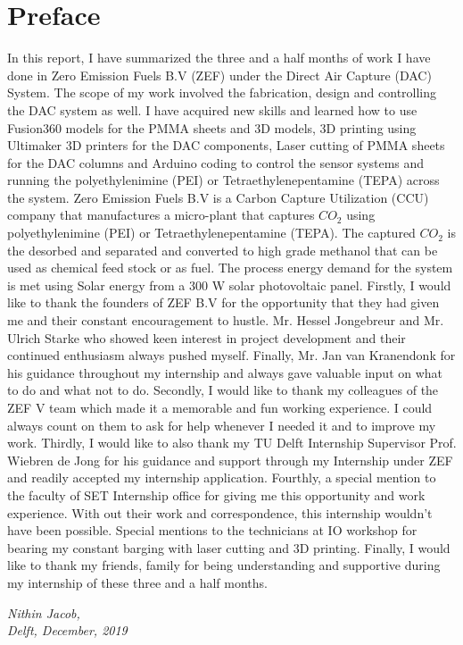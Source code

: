 \section*{Preface}

In this report, I have summarized the three and a half months of work I have done in Zero Emission Fuels B.V (ZEF) under the Direct Air Capture (DAC) System. The scope of my work involved the fabrication, design and controlling the DAC system as well. I have acquired new skills and learned how to use Fusion360 models for the PMMA sheets and 3D models, 3D printing using Ultimaker 3D printers for the DAC components, Laser cutting of PMMA sheets for the DAC columns and Arduino coding to control the sensor systems and running the polyethylenimine (PEI) or Tetraethylenepentamine (TEPA) across the system. 
\bigbreak
\noindent
Zero Emission Fuels B.V is a Carbon Capture Utilization (CCU) company that manufactures a micro-plant that captures $CO_2$ using polyethylenimine (PEI) or Tetraethylenepentamine (TEPA). The captured $CO_2$ is the desorbed and separated and converted to high grade methanol that can be used as chemical feed stock or as fuel. The process energy demand for the system is met using Solar energy from a 300 W solar photovoltaic panel.
\bigbreak
\noindent
Firstly, I would like to thank the founders of ZEF B.V for the opportunity that they had given me and their constant encouragement to hustle. Mr. Hessel Jongebreur and Mr. Ulrich Starke who showed keen interest in project development and their continued enthusiasm always pushed myself. Finally, Mr. Jan van Kranendonk for his guidance throughout my internship and always gave valuable input on what to do and what not to do. 
\bigbreak
\noindent
Secondly, I would like to thank my colleagues of the ZEF V team which made it a memorable and fun working experience. I could always count on them to ask for help whenever I needed it and to improve my work. 
\bigbreak
\noindent
Thirdly, I would like to also thank my TU Delft Internship Supervisor Prof. Wiebren de Jong for his guidance and support through my Internship under ZEF and readily accepted my internship application.  
\bigbreak
\noindent
Fourthly, a special mention to the faculty of SET Internship office for giving me this opportunity and work experience. With out their work and correspondence, this internship wouldn't have been possible. Special mentions to the technicians at IO workshop for bearing my constant barging with laser cutting and 3D printing.
\bigbreak
\noindent
Finally, I would like to thank my friends, family for being understanding and supportive during my internship of these three and a half months.

\vspace{2cm}

\noindent
\textit{Nithin Jacob, \\
Delft, December, 2019}